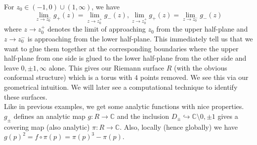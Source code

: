 For $z_0\in (-1,0)\cup(1,\infty)$, we have
$$\lim_{z\to z_0^-}g_+(z)=\lim_{z\to z_0^+}g_-(z),\lim_{z\to z_0^+}g_+(z)=\lim_{z\to z_0^-}g_-(z)$$
where $z\to z_0^+$ denotes the limit of approaching $z_0$ from the upper half-plane and $z\to z_0^-$ is approaching from the lower half-plane.
This immediately tell us that we want to glue them together at the corresponding boundaries where the upper half-plane from one side is glued to the lower half-plane from the other side and leave $0,\pm 1,\infty$ alone.
This gives our Riemann surface $R$ (with the obvious conformal structure) which is a torus with $4$ points removed.
We see this via our geometrical intuition.
We will later see a computational technique to identify these surfaces.\\
Like in previous examples, we get some analytic functions with nice properties.
$g_\pm$ defines an analytic map $g:R\to\mathbb C$ and the inclusion $D_\pm\hookrightarrow\mathbb C\setminus{0,\pm 1}$ gives a covering map (also analytic) $\pi:R\to\mathbb C$.
Also, locally (hence globally) we have $g(p)^2=f\circ\pi(p)=\pi(p)^3-\pi(p)$.